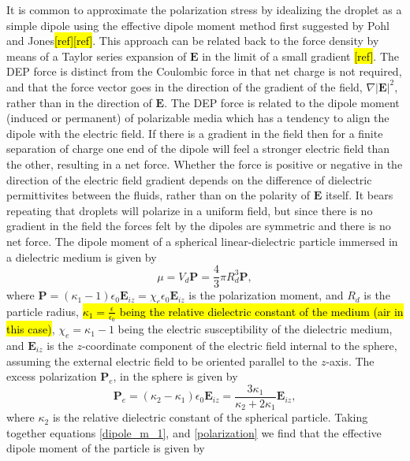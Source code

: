 \documentclass[a4paper, 12pt]{article}
\begin{document}
It is common to approximate the polarization stress by idealizing the droplet as a simple dipole using the effective dipole moment method first suggested by Pohl and Jones\hl{[ref][ref]}. This approach can be related back to the force density by means of a Taylor series expansion of $\mathbf{E}$ in the limit of a small gradient \hl{[ref]}. The DEP force is distinct from the Coulombic force in that net charge is not required, and that the force vector goes in the direction of the gradient of the field, $\nabla \left| \mathbf{E} \right|^2$, rather than in the direction of $\mathbf{E}$. The DEP force is related to the dipole moment (induced or permanent) of polarizable media which has a tendency to align the dipole with the electric field. If there is a gradient in the field then for a finite separation of charge one end of the dipole will feel a stronger electric field than the other, resulting in a net force. Whether the force is positive or negative in the direction of the electric field gradient depends on the difference of dielectric permittivites between the fluids, rather than on the polarity of $\mathbf{E}$ itself. It bears repeating that droplets will polarize in a uniform field, but since there is no gradient in the field the forces felt by the dipoles are symmetric and there is no net force. The dipole moment of a spherical linear-dielectric particle immersed in a dielectric medium is given by
\begin{equation} \label{dipole_m_1}
\mu = V_d \mathbf{P} = \frac{4}{3} \pi R_d^3 \mathbf{P},
\end{equation} 
where $\mathbf{P} = \left(\kappa_1 - 1 \right) \epsilon_0 \mathbf{E}_{iz} = \chi_e \epsilon_0 \mathbf{E}_{iz}$ is the polarization moment, and $R_d$ is the particle radius, \hl{$\kappa_1 = \frac{\epsilon}{\epsilon_0}$ being the relative dielectric constant of the medium (air in this case)}, $\chi_e = \kappa_1 - 1$ being the electric susceptibility of the dielectric medium, and $\mathbf{E}_{iz}$ is the $z$-coordinate component of the electric field internal to the sphere, assuming the external electric field to be oriented parallel to the $z$-axis. The excess polarization $\mathbf{P}_e$, in the sphere is given by
\begin{equation} \label{polarization}
\mathbf{P}_e = \left( \kappa_2 - \kappa_1 \right) \epsilon_0 \mathbf{E}_{iz} = \frac{3 \kappa_1}{\kappa_2 +2\kappa_1}\mathbf{E}_{iz},
\end{equation}
where $\kappa_2$ is the relative dielectric constant of the spherical particle. Taking together equations \ref{dipole_m_1}, and \ref{polarization} we find that the effective dipole moment of the particle is given by 
\end{document}
